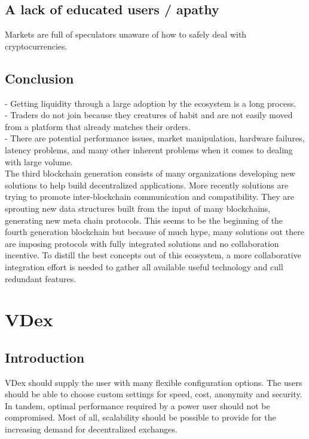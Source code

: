 \documentclass[]{article}
\begin{document}
	\subsection{A lack of educated users / apathy}
	Markets are full of speculators unaware of how to safely deal with cryptocurrencies.
	
	\subsection{Conclusion}
	- Getting liquidity through a large adoption by the ecosystem is a long process.\\
	- Traders do not join because they creatures of habit and are not easily moved from a platform that already matches their orders. \\ 
	
	- There are potential performance issues, market manipulation, hardware failures, latency problems, and many other inherent problems when it comes to dealing with large volume.\\
	
	The third blockchain generation consists of many organizations developing new solutions to help build decentralized applications. More recently solutions are trying to promote inter-blockchain communication and compatibility. They are sprouting new data structures built from the input of many blockchains, generating new meta chain protocols. This seems to be the beginning of the fourth generation blockchain but because of much hype, many solutions out there are imposing protocols with fully integrated solutions and no collaboration incentive.
	To distill the best concepts out of this ecosystem, a more collaborative integration effort is needed to gather all available useful technology and cull redundant features.

	
\section{VDex}	

\subsection{Introduction}
	 VDex should supply the user with many flexible configuration options. The users should be able to choose custom 
	settings for speed, cost, anonymity and security. In tandem, optimal  performance required by a power user should not be compromised. Most of all, scalability should be possible to provide for the increasing demand for decentralized exchanges. 
	
\end{document}
